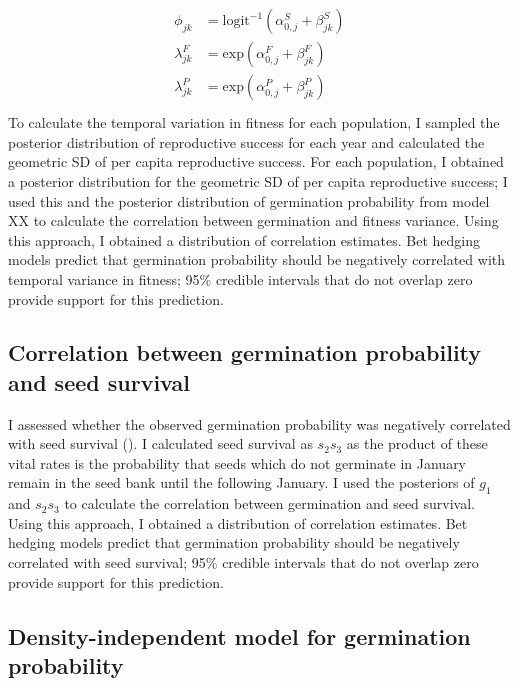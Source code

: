 \documentclass[12pt, oneside, titlepage]{article}   	%
\begin{document}
\begin{align}
  \begin{split}
\phi_{jk} & = \mathrm{logit}^{-1}(\alpha^S_{0,j} + \beta^S_{jk}) \\
\lambda^F_{jk} & = \mathrm{exp}(\alpha^F_{0,j} + \beta^F_{jk}) \\
\lambda^P_{jk} & = \mathrm{exp}(\alpha^P_{0,j} + \beta^P_{jk}) \\
  \end{split}
\end{align}
%
To calculate the temporal variation in fitness for each population, I sampled the posterior distribution of reproductive success for each year and calculated the geometric SD of per capita reproductive success. For each population, I obtained a posterior distribution for the geometric SD of per capita reproductive success; I used this and the posterior distribution of germination probability from model XX to calculate the correlation between germination and fitness variance. Using this approach, I obtained a distribution of correlation estimates. Bet hedging models predict that germination probability should be negatively correlated with temporal variance in fitness; 95\% credible intervals that do not overlap zero provide support for this prediction.

\subsection*{Correlation between germination probability and seed survival}

I assessed whether the observed germination probability was negatively correlated with seed survival (\cite{gremer2014}). I calculated seed survival as $s_2 s_3$ as the product of these vital rates is the probability that seeds which do not germinate in January remain in the seed bank until the following January. I used the posteriors of $g_1$ and $s_2 s_3$ to calculate the correlation between germination and seed survival. Using this approach, I obtained a distribution of correlation estimates. Bet hedging models predict that germination probability should be negatively correlated with seed survival; 95\% credible intervals that do not overlap zero provide support for this prediction.

\subsection*{Density-independent model for germination probability}
\end{document}

